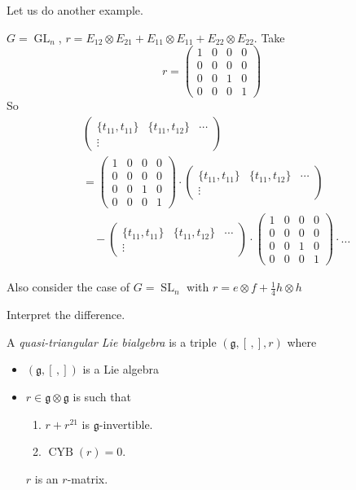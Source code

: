 Let us do another example.
\begin{example}
\label{example-l2-gln-r-matrix}
$G=\operatorname{GL}_{n}$,
$r=E_{12}\otimes E_{21}+
E_{11}\otimes E_{11}+
E_{22}\otimes E_{22}$. Take
$$
r=\begin{pmatrix}
1&0&0&0\\0&0&0&0\\0&0&1&0\\0&0&0&1
\end{pmatrix}
$$
So
$$
\begin{aligned}
&\begin{pmatrix}
\{t_{11},t_{11}\}&\{t_{11},t_{12}\}
&\cdots \\
\vdots &&
\end{pmatrix}\\
&=\begin{pmatrix}
1&0&0&0\\0&0&0&0\\0&0&1&0\\0&0&0&1
\end{pmatrix}
\cdot
\begin{pmatrix}
\{t_{11},t_{11}\}&\{t_{11},t_{12}\}
&\cdots \\
\vdots &&
\end{pmatrix}\\
&\quad -\begin{pmatrix}
\{t_{11},t_{11}\}&\{t_{11},t_{12}\}
&\cdots \\
\vdots &&
\end{pmatrix}
\cdot
\begin{pmatrix}
1&0&0&0\\0&0&0&0\\0&0&1&0\\0&0&0&1
\end{pmatrix}
\cdot \ldots
\end{aligned}
$$

Also consider the case of
$G=\operatorname{SL}_{n}$ with
$r=e\otimes f+\frac{1}{4}h\otimes h$
\end{example}

\begin{exercise}
\label{exercise-l2-difference}
Interpret the difference.
\end{exercise}

\begin{definition}
\label{definition-l2-quasi-triangular}
A {\it quasi-triangular Lie bialgebra} is
a triple $(\mathfrak{g},[\,,],r)$ where
\begin{itemize}
\item $(\mathfrak{g},[\,,])$ is a Lie
algebra
\item $r\in \mathfrak{g}\otimes
\mathfrak{g}$ is such that
\begin{enumerate}
\item $r+r^{21}$ is
$\mathfrak{g}$-invertible.
\item $\operatorname{CYB}(r)=0$.
\end{enumerate}
$r$ is an $r$-matrix.
\end{itemize}
\end{definition}

